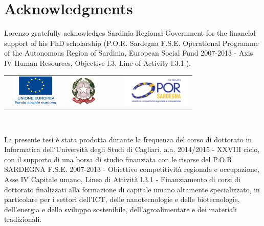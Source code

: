 \documentclass[final,a4paper,12pt,english]{UnicaPhdThesis3}
\begin{document}
	\newpage
	\section*{Acknowledgments} Lorenzo gratefully acknowledges Sardinia Regional Government for the financial support of his PhD scholarship (P.O.R. Sardegna F.S.E.  Operational Programme of the Autonomous Region of Sardinia, European Social Fund 2007-2013  - Axis IV Human Resources, Objective l.3, Line of Activity l.3.1.).
	
	\vspace{1cm}
	\begin{minipage}[t]{1\textwidth}
		\begin{center}
			\begin{tabular}[t]{cccccccc}%
				\hspace{-1.2cm}
				&
				\includegraphics[height=15mm]{./images/UE.png}
				&
				\hspace{0.8cm}
				&
				\includegraphics[height=15mm]{./images/MIUR.png}
				&
				\hspace{0.6cm}
				&
				&
				\hspace{0.6cm}
				&
				\includegraphics[height=15mm]{./images/POR.png}
			\end{tabular}\\[2em]\mbox{}
		\end{center}
	\end{minipage}
	
	La presente tesi è stata prodotta durante la frequenza del corso di dottorato in Informatica dell‘Universit\`a degli Studi di Cagliari, a.a. 2014/2015 - XXVIII ciclo, con il supporto di una borsa di studio finanziata con le risorse del P.O.R. SARDEGNA F.S.E. 2007-2013 - Obiettivo competitivit\`a regionale e occupazione, Asse IV Capitale umano, Linea di  Attivit\`a l.3.1 - Finanziamento di corsi di dottorato finalizzati alla formazione di capitale umano altamente specializzato, in particolare per i settori dell'ICT, delle nanotecnologie e delle biotecnologie, dell'energia e dello sviluppo sostenibile, dell'agroalimentare e dei materiali tradizionali.
	
\end{document}
